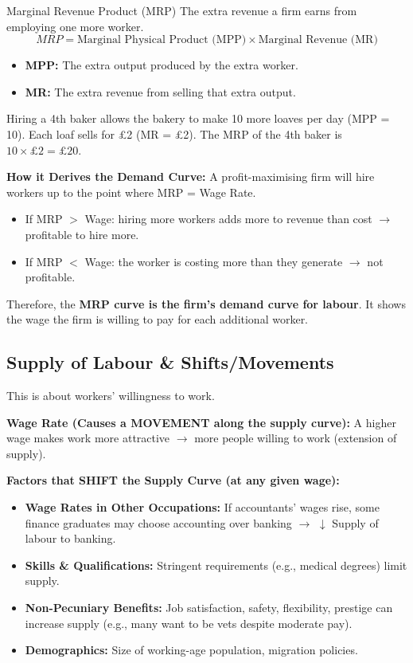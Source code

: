 \documentclass[11pt, a4paper, twoside]{book}
\begin{document}
\begin{keyterm}{Marginal Revenue Product (MRP)}
The extra revenue a firm earns from employing one more worker.
\[ MRP = \text{Marginal Physical Product (MPP)} \times \text{Marginal Revenue (MR)} \]
\begin{itemize}
  \item \textbf{MPP:} The extra output produced by the extra worker.
  \item \textbf{MR:} The extra revenue from selling that extra output.
\end{itemize}
\end{keyterm}

\begin{example}
Hiring a 4th baker allows the bakery to make 10 more loaves per day (MPP = 10). Each loaf sells for £2 (MR = £2). The MRP of the 4th baker is $10 \times £2 = £20$.
\end{example}

\textbf{How it Derives the Demand Curve:} A profit-maximising firm will hire workers up to the point where MRP = Wage Rate.
\begin{itemize}
  \item If MRP $>$ Wage: hiring more workers adds more to revenue than cost $\rightarrow$ profitable to hire more.
  \item If MRP $<$ Wage: the worker is costing more than they generate $\rightarrow$ not profitable.
\end{itemize}
Therefore, the \textbf{MRP curve is the firm's demand curve for labour}. It shows the wage the firm is willing to pay for each additional worker.

\subsection{Supply of Labour \& Shifts/Movements}

This is about workers' willingness to work.

\textbf{Wage Rate (Causes a MOVEMENT along the supply curve):} A higher wage makes work more attractive $\rightarrow$ more people willing to work (extension of supply).

\textbf{Factors that SHIFT the Supply Curve (at any given wage):}
\begin{itemize}
  \item \textbf{Wage Rates in Other Occupations:} If accountants' wages rise, some finance graduates may choose accounting over banking $\rightarrow$ $\downarrow$ Supply of labour to banking.
  \item \textbf{Skills \& Qualifications:} Stringent requirements (e.g., medical degrees) limit supply.
  \item \textbf{Non-Pecuniary Benefits:} Job satisfaction, safety, flexibility, prestige can increase supply (e.g., many want to be vets despite moderate pay).
  \item \textbf{Demographics:} Size of working-age population, migration policies.
\end{itemize}
\end{document}
